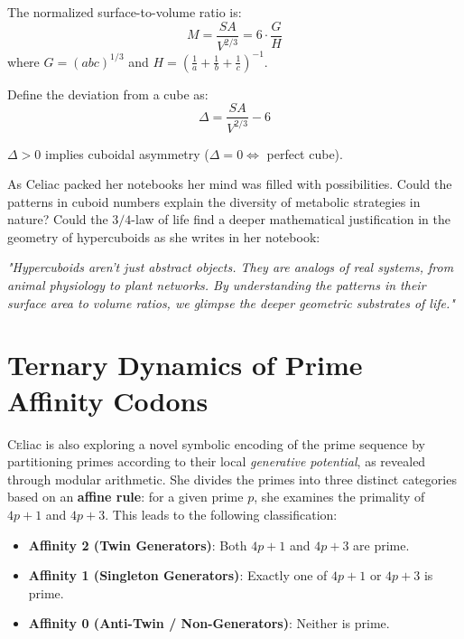 \begin{tcolorbox}[title=Cuboidness Score, colback=blue!5!white, colframe=blue!75!black]

The normalized surface-to-volume ratio is:
\[
M = \frac{SA}{V^{2/3}} = 6 \cdot \frac{G}{H}
\]
where \( G = (abc)^{1/3} \) and \( H = \left( \frac{1}{a} + \frac{1}{b} + \frac{1}{c} \right)^{-1} \).

Define the deviation from a cube as:
\[
\Delta = \frac{SA}{V^{2/3}} - 6
\]

\( \Delta > 0  \) implies cuboidal asymmetry (\( \Delta = 0 \iff\) perfect cube).

\end{tcolorbox}

As Celiac packed her notebooks her mind was filled with possibilities. Could the patterns in cuboid numbers explain the diversity of metabolic strategies in nature? Could the \(3/4\)-law of life find a deeper mathematical justification in the geometry of hypercuboids as she writes in her notebook: 

\emph{
"Hypercuboids aren’t just abstract objects. They are analogs of real systems, from animal physiology to plant networks. By understanding the patterns in their surface area to volume ratios, we glimpse the deeper geometric substrates of life."}

\section*{Ternary Dynamics of Prime Affinity Codons}

\lettrine{C}eliac is also exploring a novel symbolic encoding of the prime sequence by partitioning primes according to their local \textit{generative potential}, as revealed through modular arithmetic. She divides the primes into three distinct categories based on an \textbf{affine rule}: for a given prime \( p \), she examines the primality of \( 4p + 1 \) and \( 4p + 3 \). This leads to the following classification:

\begin{itemize}
  \item \textbf{Affinity 2 (Twin Generators)}: Both \( 4p + 1 \) and \( 4p + 3 \) are prime.
  \item \textbf{Affinity 1 (Singleton Generators)}: Exactly one of \( 4p + 1 \) or \( 4p + 3 \) is prime.
  \item \textbf{Affinity 0 (Anti-Twin / Non-Generators)}: Neither is prime.
\end{itemize}

